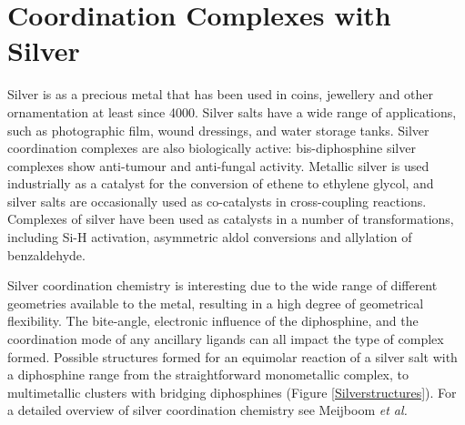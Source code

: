 
\chapter{Coordination Complexes with Silver}
\label{ch:silver}

Silver is as a precious metal that has been used in coins, jewellery and other ornamentation at least since 4000\BC.  Silver salts have a wide range of applications, such as photographic film, wound dressings, and water storage tanks.\cite{Enghag2004Ag}  Silver coordination complexes are also biologically active: bis-diphosphine silver complexes show anti-tumour and anti-fungal activity.\cite{Berners-Price1988, Liu2008}  Metallic silver is used industrially as a catalyst for the conversion of ethene to ethylene glycol, and silver salts are occasionally used as co-catalysts in cross-coupling reactions.\cite{Suzuki1999}  Complexes of silver have been used as catalysts in a number of transformations, including Si-H activation,\cite{Iglesias2012} asymmetric aldol conversions \cite{Sawamura1990} and allylation of benzaldehyde\cite{Malaise2006, Yanagisawa1999}.




Silver coordination chemistry is interesting due to the wide range of different geometries available to the metal, resulting in a high degree of geometrical flexibility. The bite-angle, electronic influence of the diphosphine, and the coordination mode of any ancillary ligands can all impact the type of complex formed.  Possible structures formed for an equimolar reaction of a silver salt with a diphosphine range from the straightforward monometallic complex, to multimetallic clusters with bridging diphosphines (Figure \ref{Silverstructures}).  For a detailed overview of silver coordination chemistry see Meijboom \emph{et al.}\cite{Meijboom2009}

